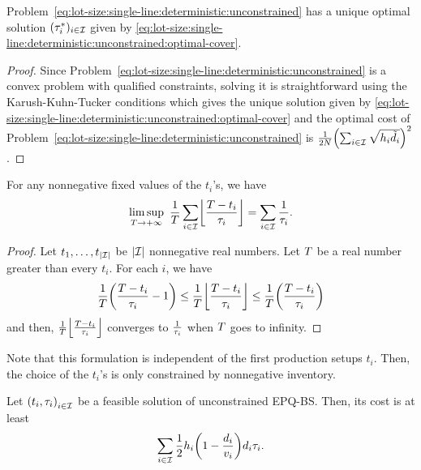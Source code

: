 \begin{lem}\label{lem:lot-size:single-line:deterministic:unconstrained:optimality}
Problem~\eqref{eq:lot-size:single-line:deterministic:unconstrained} has a unique optimal solution $(\tau_i^*)_{i\in\mathcal{I}}$ given by \cref{eq:lot-size:single-line:deterministic:unconstrained:optimal-cover}.
\end{lem}


\begin{proof}
Since Problem~\eqref{eq:lot-size:single-line:deterministic:unconstrained} is a convex problem with qualified constraints, solving it is straightforward using the Karush-Kuhn-Tucker conditions which gives the unique solution given by \cref{eq:lot-size:single-line:deterministic:unconstrained:optimal-cover} and the optimal cost of Problem~\eqref{eq:lot-size:single-line:deterministic:unconstrained} is $\frac{1}{2\nbsetups}\bracket{\sum_{i\in\REF}\sqrt{\holding_i\tilde{\demand_i}}}^2$.
\end{proof}


\begin{lem}\label{lem:lot-size:deterministic:single-line:models:average-setup}
For any nonnegative fixed values of the $t_i$'s, we have
\begin{equation}
\limsup_{\horizon\rightarrow+\infty}\ \frac{1}{\horizon} \sum_{i\in\REF} \left\lfloor\frac{\horizon-t_i}{\cover_i}\right\rfloor
=
\sum_{i\in\REF} \frac{1}{\cover_i}.
\end{equation}
\end{lem}


\begin{proof}
Let $t_1,\ldots,t_{\card{\REF}}$ be $\card{\REF}$ nonnegative real numbers.
Let $T$ be a real number greater than every $t_i$.
For each $i$, we have
\begin{equation}
\frac{1}{\horizon}\bracket{\frac{\horizon-t_i}{\cover_i}-1}
\le
\frac{1}{\horizon}\left\lfloor\frac{\horizon-t_i}{\cover_i}\right\rfloor
\le
\frac{1}{\horizon}\bracket{\frac{\horizon-t_i}{\cover_i}}
\end{equation}
and then, $\frac{1}{\horizon}\left\lfloor\frac{\horizon-t_i}{\cover_i}\right\rfloor$ converges to $\frac{1}{\tau_i}$ when $T$ goes to infinity.
\end{proof}


Note that this formulation is independent of the first production setups $t_i$.
Then, the choice of the $t_i$'s is only constrained by nonnegative inventory.


\begin{lem}\label{lem:lot-size:deterministic:single-line:models:ZIO}
Let $\bracket{t_i,\cover_i}_{i\in\REF}$ be a feasible solution of unconstrained EPQ-BS.
Then, its cost is at least
\begin{equation}
  \sum_{i\in\REF}\frac{1}{2}\holding_i\bracket{1-\frac{\demand_i}{\rate_i}}\demand_i\cover_i.
\end{equation}
\end{lem}


